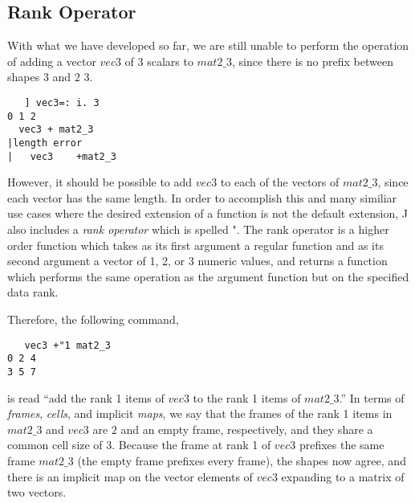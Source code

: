 \subsection{Rank Operator}
With what we have developed so far, we are still unable to perform the operation of 
adding a vector $vec3$ of 3 scalars to $mat2\_3$, since there is no prefix between shapes $3$ and $2$ $3$.

\begin{verbatim}
   ] vec3=: i. 3
0 1 2
  vec3 + mat2_3
|length error
|   vec3    +mat2_3
\end{verbatim}

However, it should be possible to add $vec3$ to each of the vectors of $mat2\_3$, since each vector has the same length.
In order to accomplish this and many similiar use cases where the desired extension of a function is not the default extension, 
J also includes a \textit{rank operator} which is spelled \ttfamily"\normalfont.
The rank operator is a higher order function which takes as its first argument a regular function 
and as its second argument a vector of 1, 2, or 3 numeric values, 
and returns a function which performs the same operation as the argument function but on the specified data rank.\cite{rankanduni}

Therefore, the following command, 

\begin{verbatim}
   vec3 +"1 mat2_3
0 2 4
3 5 7
\end{verbatim}

is read ``add the rank 1 items of $vec3$ to the rank 1 items of $mat2\_3$.''
In terms of \textit{frames}, \textit{cells}, and implicit \textit{maps}, we say that
the frames of the rank 1 items in $mat2\_3$ and $vec3$ are $2$ and an empty frame, respectively, and they share a common cell size of $3$.
Because the frame at rank 1 of $vec3$ prefixes the same frame $mat2\_3$ (the empty frame prefixes every frame), 
the shapes now agree, and there is an implicit map on the vector elements of $vec3$ expanding to a matrix of two vectors.

